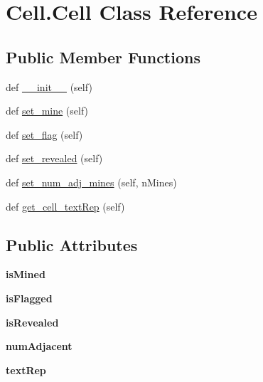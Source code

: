 \hypertarget{class_cell_1_1_cell}{}\section{Cell.\+Cell Class Reference}
\label{class_cell_1_1_cell}
\subsection*{Public Member Functions}
\begin{DoxyCompactItemize}
\item 
def \mbox{\hyperlink{class_cell_1_1_cell_a2507e24b7fd159b949e0eae9c4f26f64}{\+\_\+\+\_\+init\+\_\+\+\_\+}} (self)
\item 
def \mbox{\hyperlink{class_cell_1_1_cell_ac79f4595ce241a92297768dbc5aad4dc}{set\+\_\+mine}} (self)
\item 
def \mbox{\hyperlink{class_cell_1_1_cell_ac0a083ab6a33c3a1886134a1fc1369ef}{set\+\_\+flag}} (self)
\item 
def \mbox{\hyperlink{class_cell_1_1_cell_a3edb2b41e0679a26da351daeaf6c20ed}{set\+\_\+revealed}} (self)
\item 
def \mbox{\hyperlink{class_cell_1_1_cell_acb977a068cd459ae068fcc35e1b4a879}{set\+\_\+num\+\_\+adj\+\_\+mines}} (self, n\+Mines)
\item 
def \mbox{\hyperlink{class_cell_1_1_cell_a0565862f2b86fb47e48f9d814bd52f7b}{get\+\_\+cell\+\_\+text\+Rep}} (self)
\end{DoxyCompactItemize}
\subsection*{Public Attributes}
\begin{DoxyCompactItemize}
\item 
\mbox{\label{class_cell_1_1_cell_a2de94d961ce38593b5e2a9ff557d9607}} 
{\bfseries is\+Mined}
\item 
\mbox{\label{class_cell_1_1_cell_a021c79a228f8c3add4e12a2cd71d64d1}} 
{\bfseries is\+Flagged}
\item 
\mbox{\label{class_cell_1_1_cell_af4103c48a2f2bcd2557a6e77b15fda8c}} 
{\bfseries is\+Revealed}
\item 
\mbox{\label{class_cell_1_1_cell_aca8110187e56365b1441bf12f7537da4}} 
{\bfseries num\+Adjacent}
\item 
\mbox{\label{class_cell_1_1_cell_a099cdf84d5d4a0e48d3fc02ceafaee30}} 
{\bfseries text\+Rep}
\end{DoxyCompactItemize}


